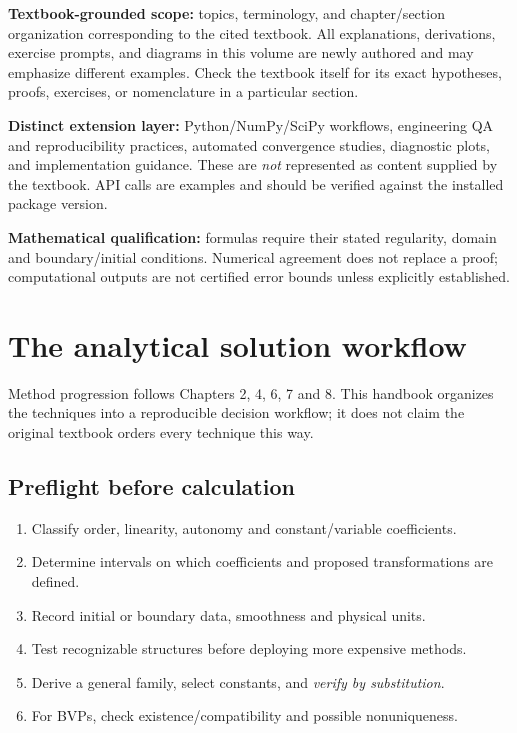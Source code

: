 \documentclass[11pt,letterpaper,oneside]{report}
\theoremstyle{definition}\newtheorem{definition}[theorem]{Definition}
\theoremstyle{remark}\newtheorem{remark}[theorem]{Remark}
\begin{document}
\begin{bookground}
\textbf{Textbook-grounded scope:} topics, terminology, and chapter/section organization corresponding to the cited textbook. All explanations, derivations, exercise prompts, and diagrams in this volume are newly authored and may emphasize different examples. Check the textbook itself for its exact hypotheses, proofs, exercises, or nomenclature in a particular section.
\end{bookground}
\begin{modern}
\textbf{Distinct extension layer:} Python/NumPy/SciPy workflows, engineering QA and reproducibility practices, automated convergence studies, diagnostic plots, and implementation guidance. These are \emph{not} represented as content supplied by the textbook. API calls are examples and should be verified against the installed package version.
\end{modern}
\begin{caution}
\textbf{Mathematical qualification:} formulas require their stated regularity, domain and boundary/initial conditions. Numerical agreement does not replace a proof; computational outputs are not certified error bounds unless explicitly established.
\end{caution}
\tableofcontents\clearpage{}
\chapter{The analytical solution workflow}
\begin{bookground}Method progression follows Chapters 2, 4, 6, 7 and 8. This handbook organizes the techniques into a reproducible decision workflow; it does not claim the original textbook orders every technique this way.\end{bookground}
\section{Preflight before calculation}
\begin{enumerate}
\item Classify order, linearity, autonomy and constant/variable coefficients.
\item Determine intervals on which coefficients and proposed transformations are defined.
\item Record initial or boundary data, smoothness and physical units.
\item Test recognizable structures before deploying more expensive methods.
\item Derive a general family, select constants, and \emph{verify by substitution}.
\item For BVPs, check existence/compatibility and possible nonuniqueness.
\end{enumerate}
\end{document}
